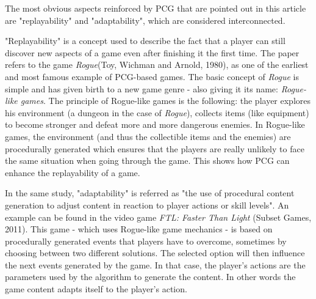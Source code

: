 The most obvious aspects reinforced by PCG that are pointed out in this article are "replayability" and "adaptability", which are considered interconnected.

"Replayability" is a concept used to describe the fact that a player can still discover new aspects of a game even after finishing it the first time. The paper refers to the game \textit{Rogue}(Toy, Wichman and Arnold, 1980)\cite{game:rogue}, as one of the earliest and most famous example of PCG-based games. The basic concept of \textit{Rogue} is simple and has given birth to a new game genre - also giving it its name: \textit{Rogue-like games}. The principle of Rogue-like games is the following: the player explores his environment (a dungeon in the case of \textit{Rogue}), collects items (like equipment) to become stronger and defeat more and more dangerous enemies. In Rogue-like games, the environment (and thus the collectible items and the enemies) are procedurally generated which ensures that the players are really unlikely to face the same situation when going through the game. This shows how PCG can enhance the replayability of a game.

In the same study, "adaptability" is referred as "the use of procedural content generation to adjust content in reaction to player actions or skill levels". An example can be found in the video game \textit{FTL: Faster Than Light} (Subset Games, 2011)\cite{game:FTL}. This game - which uses Rogue-like game mechanics - is based on procedurally generated events that players   have to overcome, sometimes by choosing between two different solutions. The selected option will then influence the next events generated by the game. In that case, the player's actions are the parameters used by the algorithm to generate the content. In other words the game content adapts itself to the player's action.

